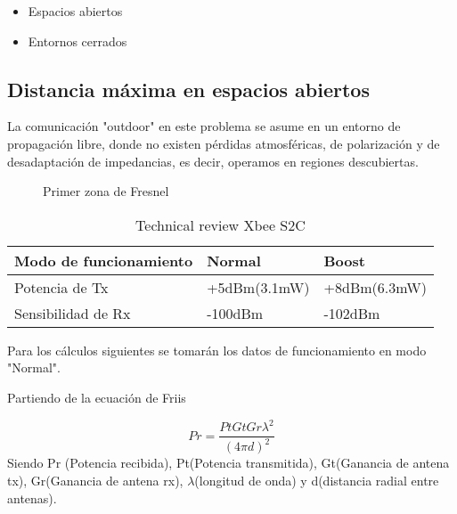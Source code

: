 \documentclass[preprint,12pt]{elsarticle}
\begin{document}
\begin{itemize}
\item Espacios abiertos 
\item Entornos cerrados
\end{itemize}


\subsection{Distancia m\'axima en espacios abiertos}

 La comunicaci\'on "outdoor" en este problema se asume en un entorno de propagaci\'on libre, donde no existen p\'erdidas atmosf\'ericas, de polarizaci\'on y de desadaptaci\'on de impedancias, es decir, operamos en regiones descubiertas. 
 
\begin{figure}[h]
	\caption{Primer zona de Fresnel}
\end{figure}

\begin{table}[h]
\centering
\begin{tabular}{l l l}
\hline
\textbf{Modo de funcionamiento} & \textbf{Normal} & \textbf{Boost}\\
\hline
Potencia de Tx & +5dBm(3.1mW) & +8dBm(6.3mW) \\
Sensibilidad de Rx & -100dBm & -102dBm\\
\hline
\end{tabular}
\caption{Technical review Xbee S2C}
\end{table}
Para los c\'alculos siguientes se tomar\'an los datos de funcionamiento en modo "Normal".

Partiendo de la ecuaci\'on de Friis\cite{bilb:Friis}




\begin{equation*}
\label{Ec:Friis}
Pr = \frac{Pt Gt Gr \lambda ^{2}}{(4\pi d)^2}
\end{equation*}
Siendo Pr (Potencia recibida), Pt(Potencia transmitida), Gt(Ganancia de antena tx), Gr(Ganancia de antena rx), $\lambda$(longitud de onda) y d(distancia radial entre antenas).
\end{document}
